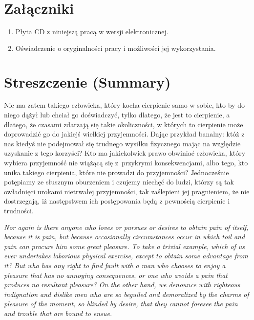 \documentclass[12pt]{mwbk}
\theoremstyle{plain}
\theoremstyle{definition}
\theoremstyle{remark}
\begin{document}
\listoffigures

\listoftables


\chapter*{Załączniki}
\begin{enumerate}
\item Płyta CD z niniejszą pracą w wersji elektronicznej.
\item Oświadczenie o oryginalności pracy i możliwości jej wykorzystania. 
\end{enumerate}




\chapter*{Streszczenie (Summary)}

\bigskip
\bigskip

\begin{center}
  \textbf{\tytul}
\end{center}


Nie ma zatem takiego człowieka, który kocha cierpienie samo w sobie, 
kto by do niego dążył lub chciał go doświadczyć, tylko dlatego, że
jest to cierpienie, a dlatego, że czasami zdarzają się takie 
okoliczności, w których to cierpienie może doprowadzić 
go do jakiejś wielkiej przyjemności. 
Dając przykład banalny: któż z nas kiedyś nie podejmował 
się trudnego wysiłku fizycznego mając na względzie 
uzyskanie z tego korzyści? 
Kto ma jakiekolwiek prawo obwiniać człowieka, 
który wybiera przyjemność nie wiążącą się z~przykrymi 
konsekwencjami, albo tego, kto unika takiego cierpienia, 
które nie prowadzi do przyjemności? 
Jednocześnie potępiamy ze słusznym oburzeniem i czujemy 
niechęć do ludzi, którzy są tak owładnięci urokami nietrwałej 
przyjemności, tak zaślepieni jej pragnieniem, 
że nie dostrzegają, iż następstwem ich 
postępowania będą z pewnością cierpienie i trudności.

\bigskip

\begin{center}
  \textbf{\textit{\tytulangielski}}
\end{center}


{\it
Nor again is there anyone who loves or pursues or desires to obtain
pain of itself, because it is pain, but because occasionally
circumstances occur in which toil and pain can procure him some great
pleasure. To take a trivial example, which of us ever undertakes
laborious physical exercise, except to obtain some advantage from it?
But who has any right to find fault with a man who chooses to enjoy a
pleasure that has no annoying consequences, or one who avoids a pain
that produces no resultant pleasure?
On the other hand, we denounce with righteous indignation and dislike
men who are so beguiled and demoralized by the charms of pleasure of
the moment, so blinded by desire, that they cannot foresee the pain
and trouble that are bound to ensue.
}
\end{document}
